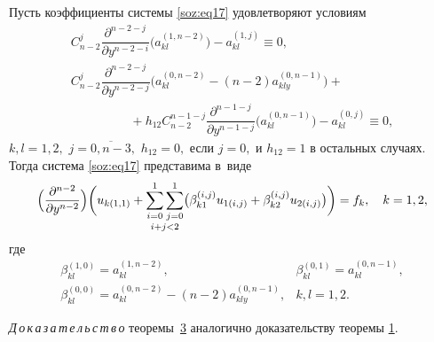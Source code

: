 \medskip
\hypertarget{soz:th3}{}
\begin{theorem}[3]Пусть коэффициенты системы \eqref{soz:eq17} удовлетворяют условиям
\begin{equation}
\label{soz:eq18}
\begin{array}{l}
C_{n-2}^{j}\dfrac{\partial^{n-2-j}}{\partial y^{n-2-i}} \bigl(a_{kl}^{(1,n-2)} \bigr)-a_{kl}^{(1,j)}\equiv0,\\[2mm]
C_{n-2}^{j}\dfrac{\partial^{n-2-j}}{\partial y^{n-2-j}} \bigl(a_{kl}^{(0,n-2)}-(n-2)a_{kly}^{(0,n-1)}\bigr)+
\\[2mm]
\hspace{2cm} +h_{12}C_{n-2}^{n-1-j}\dfrac{\partial^{n-1-j}}{\partial y^{n-1-j}} \bigl(a_{kl}^{(0,n-1)}\bigr)-a_{kl}^{(0,j)}\equiv0,
\end{array}
\end{equation}
 $k, l=1, 2,$ $j=\overline{0, n-3},$ $h_{12}=0,$ 
если $j=0,$ и $h_{12}=1$ в остальных случаях$.$ 
Тогда система \eqref{soz:eq17} представима в~виде
\begin{equation*}
\Bigl(\frac{\partial^{n-2}}{\partial y^{n-2}}\Bigr)
\biggl(u_{k(1,1)}+\mathop{\sum\limits_{i=0}^{1}\sum\limits_{j=0}^{1}}\limits_{i + j < 2} 
\bigl(\beta_{k1}^{(i,j)}u_{1(i,j)}+\beta_{k2}^{(i,j)}u_{2(i,j)} \bigr) \biggr)=f_{k}, \quad  k=1, 2,
\end{equation*}
 где
\begin{equation*}
\begin{array}{rl}
\beta_{kl}^{(1,0)}=a_{kl}^{(1,n-2)}, &  \beta_{kl}^{(0,1)}=a_{kl}^{(0,n-1)},\\[2mm] \beta_{kl}^{(0,0)}=a_{kl}^{(0,n-2)}-(n-2)a_{kly}^{(0,n-1)}, & k, l=1, 2.
\end{array}
\end{equation*}
\end{theorem} 

\medskip
{\it Д\,о\,к\,а\,з\,а\,т\,е\,л\,ь\,с\,т\,в\,о\/} теоремы~\hyperlink{soz:th3}{3} аналогично доказательству теоремы \hyperlink{soz:th1}{1}.


